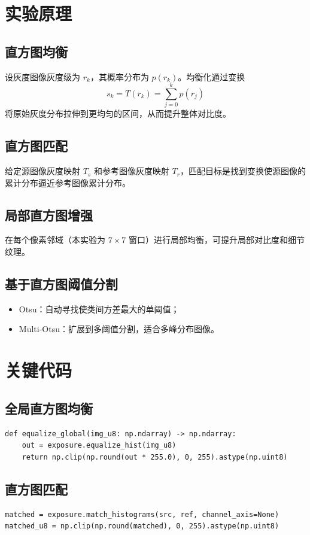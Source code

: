 \documentclass[UTF8,a4paper,12pt]{ctexart}
\begin{document}
\section{实验原理}
\subsection{直方图均衡}
设灰度图像灰度级为 $r_k$，其概率分布为 $p(r_k)$。均衡化通过变换
\begin{equation}
s_k = T(r_k)=\sum_{j=0}^{k}p(r_j)
\end{equation}
将原始灰度分布拉伸到更均匀的区间，从而提升整体对比度。

\subsection{直方图匹配}
给定源图像灰度映射 $T_s$ 和参考图像灰度映射 $T_r$，匹配目标是找到变换使源图像的累计分布逼近参考图像累计分布。

\subsection{局部直方图增强}
在每个像素邻域（本实验为 $7\times7$ 窗口）进行局部均衡，可提升局部对比度和细节纹理。

\subsection{基于直方图阈值分割}
\begin{itemize}
  \item Otsu：自动寻找使类间方差最大的单阈值；
  \item Multi-Otsu：扩展到多阈值分割，适合多峰分布图像。
\end{itemize}

\section{关键代码}
\subsection{全局直方图均衡}
\begin{lstlisting}[style=py]
def equalize_global(img_u8: np.ndarray) -> np.ndarray:
    out = exposure.equalize_hist(img_u8)
    return np.clip(np.round(out * 255.0), 0, 255).astype(np.uint8)
\end{lstlisting}

\subsection{直方图匹配}
\begin{lstlisting}[style=py]
matched = exposure.match_histograms(src, ref, channel_axis=None)
matched_u8 = np.clip(np.round(matched), 0, 255).astype(np.uint8)
\end{lstlisting}
\end{document}
